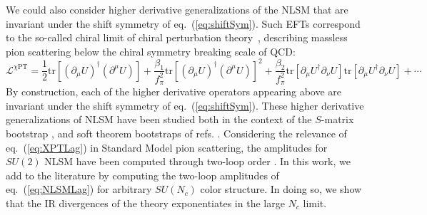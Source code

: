 \documentclass[11pt,letter]{article}
\def\eqn#1{eq.~(\ref{#1})}
\begin{document}
We could also consider higher derivative generalizations of the NLSM that are invariant under the shift symmetry of \eqn{eq:shiftSym}.  Such  EFTs correspond to the so-called chiral limit of {chiral perturbation theory}~\cite{Weinberg:1978kz,Gasser:1983yg,Kampf:2006yf}, describing massless pion scattering below the chiral symmetry breaking scale of QCD:
\begin{equation}\label{eq:XPTLag}
\mathcal{L}^{\chi\text{PT}}=\frac{1}{2}\text{tr}[(\partial_\mu U)^\dagger (\partial ^\mu U)] + \frac{\beta_1}{f_\pi^2} \text{tr}[(\partial_\mu U)^\dagger (\partial ^\mu U)]^2 + \frac{\beta_2}{f_\pi^2} \text{tr}[\partial_\mu U^\dagger \partial_\nu U]\text{tr}[\partial_\mu U^\dagger \partial_\nu U] +\cdots
\end{equation}
By construction, each of the higher derivative operators appearing above are invariant under the shift symmetry of \eqn{eq:shiftSym}. These higher derivative generalizations of NLSM have been studied both in the context of the $S$-matrix bootstrap \cite{Manohar:2008tc,Bellazzini:2016xrt,Guerrieri:2020bto}, and soft theorem bootstraps of refs. \cite{Cheung:2014dqa,Cheung:2015ota,Cheung:2016drk,Cheung:2018oki,Low:2019ynd}. Considering the relevance of \eqn{eq:XPTLag} in Standard Model pion scattering, the amplitudes for $SU(2)$ NLSM have been computed through two-loop order \cite{Bijnens:1995yn,Bijnens:1997vq,Girlanda:1997ed}. In this work, we add to the literature by computing the two-loop amplitudes of \eqn{eq:NLSMLag} for arbitrary $SU(N_c)$ color structure. In doing so, we show that the IR divergences of the theory exponentiates in the large $N_c$ limit. 
\end{document}
